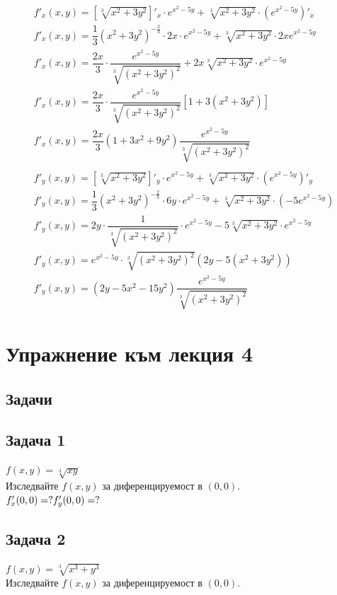 \documentclass[a4paper,fleqn,12pt]{article}
\theoremstyle{definition}
\begin{document}
\begin{enumerate}
\begin{gather*}
f'_x(x,y) = \left[ \sqrt[3]{x^2+3y^2} \right]'_x \cdot e^{x^2 - 5y} + \sqrt[3]{x^2+3y^2} \cdot (e^{x^2 - 5y})'_x\\
f'_x(x,y) = \dfrac{1}{3} (x^2 + 3y^2)^{- \frac{2}{3}} \cdot 2x  \cdot e^{x^2 - 5y} +  \sqrt[3]{x^2+3y^2}\cdot 2x e^{x^2 - 5y} \\
f'_x(x,y) = \dfrac{2x}{3} \cdot \dfrac{e^{x^2 - 5y}}{\sqrt[3]{(x^2+3y^2)^2}} + 2x \sqrt[3]{x^2+3y^2} \cdot e^{x^2 - 5y} \\
f'_x(x,y) = \dfrac{2x}{3} \cdot \dfrac{e^{x^2 - 5y}}{\sqrt[3]{(x^2+3y^2)^2}} \left[ 1 + 3(x^2 + 3y^2) \right] \\
f'_x(x,y) = \dfrac{2x}{3} (1 + 3x^2 + 9y^2) \dfrac {e^{x^2 - 5y}}{\sqrt[3]{(x^2+3y^2)^2}}\\
\\
f'_y(x,y) =  \left[ \sqrt[3]{x^2+3y^2} \right]'_y \cdot e^{x^2 - 5y} + \sqrt[3]{x^2+3y^2} \cdot (e^{x^2 - 5y})'_y\\
f'_y(x,y) = \dfrac{1}{3} (x^2 + 3y^2)^{- \frac{2}{3}} \cdot 6y  \cdot e^{x^2 - 5y} +  \sqrt[3]{x^2+3y^2}\cdot (-5e^{x^2 - 5y}) \\
f'_y(x,y) = 2y \cdot \dfrac{1}{\sqrt[3]{(x^2+3y^2)^2}} \cdot e^{x^2 - 5y} - 5  \sqrt[3]{x^2+3y^2}\cdot e^{x^2 - 5y} \\
f'_y(x,y) = e^{x^2 - 5y} \cdot \sqrt[3]{(x^2+3y^2)^2} (2y - 5(x^2 + 3y^2)) \\
f'_y(x,y) = (2y - 5x^2 - 15y^2) \dfrac{e^{x^2 - 5y}}{\sqrt[3]{(x^2+3y^2)^2}}
\end{gather*}
\end{enumerate}

\newpage
\section{Упражнение към лекция 4}

\subsection{Задачи}

\subsection*{Задача 1}
$f(x,y) = \sqrt[3]{xy}$\\
Изследвайте $f(x,y)$ за диференцируемост в $(0,0)$.\\
$f'_x (0,0) = ?\\
f'_y (0,0) = ?$ 

\subsection*{Задача 2}
$f(x,y) = \sqrt[3]{x^3 + y^3}$\\
Изследвайте $f(x,y)$ за диференцируемост в $(0,0)$.
\end{document}
